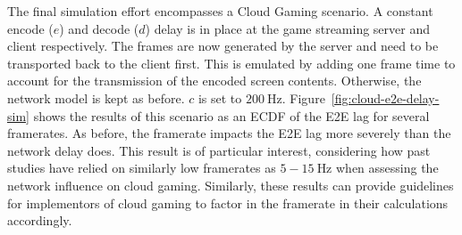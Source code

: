 The final simulation effort encompasses a Cloud Gaming scenario. A constant encode ($e$) and decode ($d$) delay is in place at the game streaming server and client respectively. The frames are now generated by the server and need to be transported back to the client first. This is emulated by adding one frame time to account for the transmission of the encoded screen contents. Otherwise, the network model is kept as before. $c$ is set to $\SI{200}{\hertz}$. Figure~\ref{fig:cloud-e2e-delay-sim} shows the results of this scenario as an \gls{ECDF} of the \gls{E2E} lag for several framerates. As before, the framerate impacts the \gls{E2E} lag more severely than the network delay does. This result is of particular interest, considering how past studies have relied on similarly low framerates as $5-\SI{15}{\hertz}$ when assessing the network influence on cloud gaming. Similarly, these results can provide guidelines for implementors of cloud gaming to factor in the framerate in their calculations accordingly.


